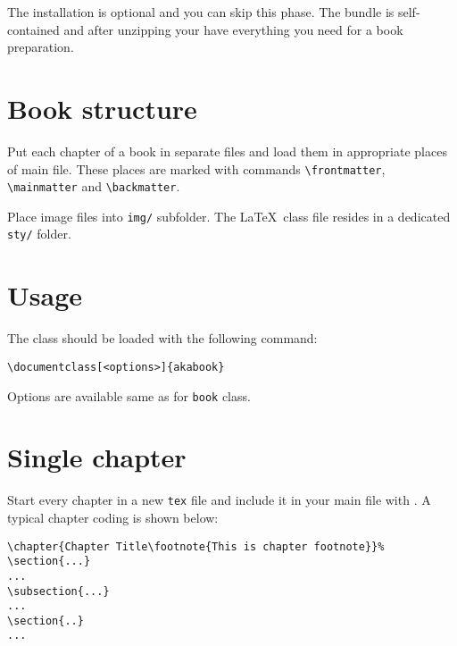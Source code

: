 \documentclass{ltxdoc}
\def\file#1{\texttt{#1}}
\begin{document}
The installation is optional and you can skip this phase.
The bundle is self-contained and after unzipping your have everything you need for a book preparation. 


\section{Book structure}\label{bookstructure}

Put each chapter of a book in separate files and load them in appropriate places
of main file. These places are marked with commands \verb|\frontmatter|, \verb|\mainmatter| and \verb|\backmatter|.

Place image files into  \file{img/} subfolder. 
The \LaTeX\ class file resides in  a dedicated \file{sty/} folder.



\section{Usage}

The class should be loaded with the following command:

\begin{verbatim}
\documentclass[<options>]{akabook}
\end{verbatim}

Options are available same as for \file{book} class.

\section{Single chapter}

Start every chapter in a new \texttt{tex} file and include it in your main file
with \verb||.
A typical chapter coding is shown below:

\begin{Verbatim}
\chapter{Chapter Title\footnote{This is chapter footnote}}%
\section{...}
...
\subsection{...}
...
\section{..}
...
\end{Verbatim}
\end{document}
